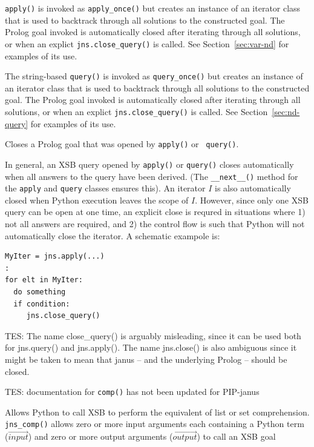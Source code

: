 \begin{description}
%
{\tt apply()} is invoked as {\tt apply\_once()} but creates an
instance of an iterator class that is used to backtrack through all
solutions to the constructed goal.  The Prolog goal invoked is
automatically closed after iterating through all solutions, or when an
explict {\tt jns.close\_query()} is called.  See
Section~\ref{sec:var-nd} for examples of its use.

%
The string-based {\tt query()} is invoked as {\tt query\_once()} but
creates an instance of an iterator class that is used to backtrack
through all solutions to the constructed goal.  The Prolog goal
invoked is automatically closed after iterating through all solutions,
or when an explict {\tt jns.close\_query()} is called.  See
Section~\ref{sec:nd-query} for examples of its use.

Closes a Prolog goal that was opened by {\tt apply()} or {\tt
  query()}.

In general, an XSB query opened by {\tt apply()} or {\tt query()}
closes automatically when all answers to the query have been derived.
(The {\tt \_\_next\_\_()} method for the {\tt apply} and {\tt query}
classes ensures this).  An iterator $I$ is also automatically closed
when Python execution leaves the scope of $I$.  However, since only
one XSB query can be open at one time, an explicit close is requred in
situations where 1) not all answers are required, and 2) the control
flow is such that Python will not automatically close the iterator.  A
schematic exampole is:
\begin{verbatim}
MyIter = jns.apply(...)
:
for elt in MyIter:
  do something
  if condition:
     jns.close_query()    
\end{verbatim}


{\sc TES: The name close\_query() is arguably misleading, since it can
  be used both for jns.query() and jns.apply().  The name jns.close()
  is also ambiguous since it might be taken to mean that janus -- and
  the underlying Prolog -- should be closed.}

            {\sc TES: documentation for {\tt comp()} has not been
              updated for PIP-janus}
            
  Allows Python to call XSB to perform the equivalent of list or set
  comprehension.  {\tt jns\_comp()} allows zero or more input arguments
  each containing a Python term ($\overrightarrow{input}$) and zero or
  more output arguments ($\overrightarrow{output}$) to call an XSB goal


\end{description}
